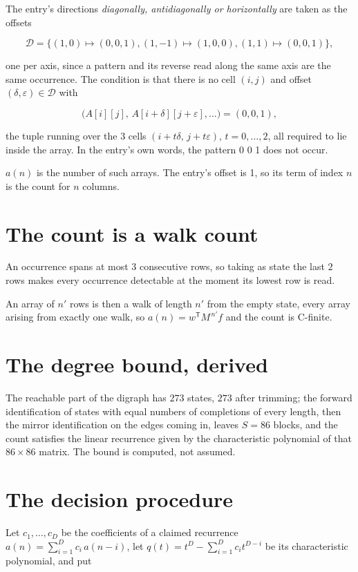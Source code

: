 \documentclass[11pt]{article}
\theoremstyle{definition}
\begin{document}
The entry's directions {\itshape diagonally, antidiagonally or horizontally} are taken as the offsets

\[\mathcal{D} = \{(1,0)\mapsto(0,0,1), (1,-1)\mapsto(1,0,0), (1,1)\mapsto(0,0,1)\},\]

one per axis, since a pattern and its reverse read along the same axis are the same occurrence. The condition is that there is no cell $(i,j)$ and offset $(\delta,\varepsilon)\in\mathcal{D}$ with

\[\bigl(A[i][j],\,A[i{+}\delta][j{+}\varepsilon],\dots\bigr) = (0, 0, 1),\]

the tuple running over the $3$ cells $(i+t\delta,\,j+t\varepsilon)$, $t = 0,\dots,2$, all required to lie inside the array. In the entry's own words, the pattern 0 0 1 does not occur.

$a(n)$ is the number of such arrays. The entry's offset is 1, so its term of index $n$ is the count for $n$ columns.

\section{The count is a walk count}

An occurrence spans at most $3$ consecutive rows, so taking as state the last $2$ rows makes every occurrence detectable at the moment its lowest row is read.

An array of $n'$ rows is then a walk of length $n'$ from the empty state, every array arising from exactly one walk, so $a(n) = w^{\mathsf T}M^{\,n'}f$ and the count is C-finite.

\section{The degree bound, derived}

The reachable part of the digraph has $273$ states, $273$ after trimming; the forward identification of states with equal numbers of completions of every length, then the mirror identification on the edges coming in, leaves $S = 86$ blocks, and the count satisfies the linear recurrence given by the characteristic polynomial of that $86\times86$ matrix. The bound is computed, not assumed.

\section{The decision procedure}

Let $c_1,\dots,c_D$ be the coefficients of a claimed recurrence $a(n) = \sum_{i=1}^{D} c_i\,a(n-i)$, let $q(t) = t^{D} - \sum_{i=1}^{D} c_i t^{D-i}$ be its characteristic polynomial, and put
\end{document}
